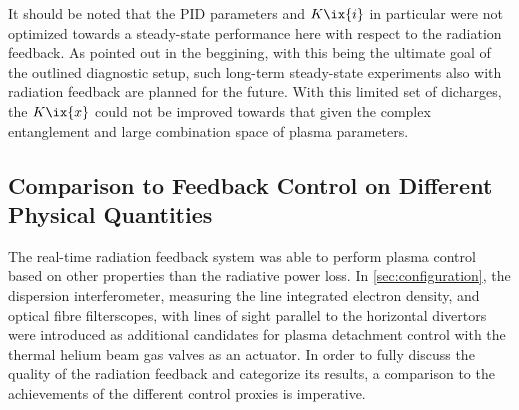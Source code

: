 %
            It should be noted that the PID parameters and $K\ix{i}$ in particular were not optimized towards a steady-state performance here with respect to the radiation feedback. As pointed out in the beggining, with this being the ultimate goal of the outlined diagnostic setup, such long-term steady-state experiments also with radiation feedback are planned for the future. With this limited set of dicharges, the $K\ix{x}$ could not be improved towards that given the complex entanglement and large combination space of plasma parameters.%
%
        \subsection{Comparison to Feedback Control on Different Physical Quantities}\label{subsec:densityfeedback}%
%
            The real-time radiation feedback system was able to perform plasma control based on other properties than the radiative power loss. In \cref{sec:configuration}, the dispersion interferometer, measuring the line integrated electron density, and optical fibre filterscopes, with lines of sight parallel to the horizontal divertors were introduced as additional candidates for plasma detachment control with the thermal helium beam gas valves as an actuator. In order to fully discuss the quality of the radiation feedback and categorize its results, a comparison to the achievements of the different control proxies is imperative.%
%

